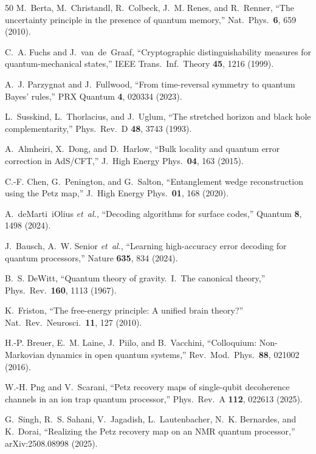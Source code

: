 \documentclass[prl,twocolumn,superscriptaddress,longbibliography,floatfix]{revtex4-2}
\begin{document}
\begin{thebibliography}{50}
M.~Berta, M.~Christandl, R.~Colbeck, J.~M. Renes, and
R.~Renner,
``The uncertainty principle in the presence of quantum memory,''
Nat.\ Phys.\ \textbf{6}, 659 (2010).

C.~A. Fuchs and J.~van~de~Graaf,
``Cryptographic distinguishability measures for quantum-mechanical
states,''
IEEE Trans.\ Inf.\ Theory \textbf{45}, 1216 (1999).

A.~J. Parzygnat and J.~Fullwood,
``From time-reversal symmetry to quantum Bayes' rules,''
PRX Quantum \textbf{4}, 020334 (2023).

L.~Susskind, L.~Thorlacius, and J.~Uglum,
``The stretched horizon and black hole complementarity,''
Phys.\ Rev.\ D \textbf{48}, 3743 (1993).

A.~Almheiri, X.~Dong, and D.~Harlow,
``Bulk locality and quantum error correction in AdS/CFT,''
J.\ High Energy Phys.\ \textbf{04}, 163 (2015).

C.-F. Chen, G.~Penington, and G.~Salton,
``Entanglement wedge reconstruction using the Petz map,''
J.\ High Energy Phys.\ \textbf{01}, 168 (2020).

A.~deMarti~iOlius \emph{et~al.},
``Decoding algorithms for surface codes,''
Quantum \textbf{8}, 1498 (2024).

J.~Bausch, A.~W. Senior \emph{et~al.},
``Learning high-accuracy error decoding for quantum processors,''
Nature \textbf{635}, 834 (2024).

B.~S. DeWitt,
``Quantum theory of gravity.\ I.\ The canonical theory,''
Phys.\ Rev.\ \textbf{160}, 1113 (1967).

K.~Friston,
``The free-energy principle: A unified brain theory?''
Nat.\ Rev.\ Neurosci.\ \textbf{11}, 127 (2010).

H.-P. Breuer, E.~M. Laine, J.~Piilo, and B.~Vacchini,
``Colloquium: Non-Markovian dynamics in open quantum systems,''
Rev.\ Mod.\ Phys.\ \textbf{88}, 021002 (2016).

W.-H. Png and V.~Scarani,
``Petz recovery maps of single-qubit decoherence channels in an
ion trap quantum processor,''
Phys.\ Rev.\ A \textbf{112}, 022613 (2025).

G.~Singh, R.~S. Sahani, V.~Jagadish, L.~Lautenbacher,
N.~K. Bernardes, and K.~Dorai,
``Realizing the Petz recovery map on an NMR quantum processor,''
arXiv:2508.08998 (2025).


\end{thebibliography}
\end{document}
